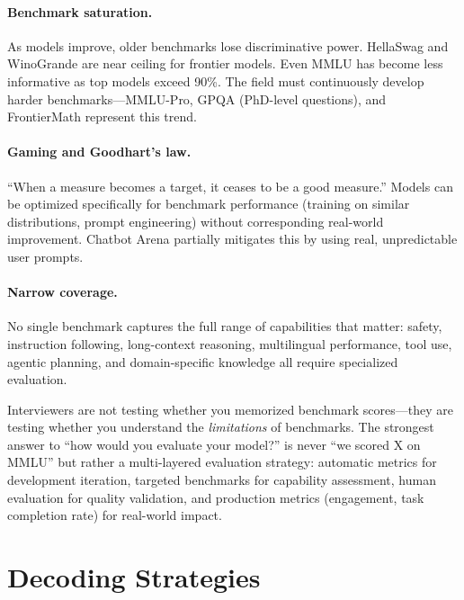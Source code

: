 \paragraph{Benchmark saturation.}
As models improve, older benchmarks lose discriminative power.  HellaSwag and
WinoGrande are near ceiling for frontier models.  Even MMLU has become less
informative as top models exceed 90\%.  The field must continuously develop
harder benchmarks---MMLU-Pro, GPQA (PhD-level questions), and FrontierMath
represent this trend.

\paragraph{Gaming and Goodhart's law.}
``When a measure becomes a target, it ceases to be a good measure.''  Models can
be optimized specifically for benchmark performance (training on similar
distributions, prompt engineering) without corresponding real-world improvement.
Chatbot Arena partially mitigates this by using real, unpredictable user prompts.

\paragraph{Narrow coverage.}
No single benchmark captures the full range of capabilities that matter:
safety, instruction following, long-context reasoning, multilingual performance,
tool use, agentic planning, and domain-specific knowledge all require specialized
evaluation.

\begin{keyinsight}
Interviewers are not testing whether you memorized benchmark scores---they are
testing whether you understand the \emph{limitations} of benchmarks.  The
strongest answer to ``how would you evaluate your model?'' is never ``we scored
X on MMLU'' but rather a multi-layered evaluation strategy: automatic metrics
for development iteration, targeted benchmarks for capability assessment, human
evaluation for quality validation, and production metrics (engagement, task
completion rate) for real-world impact.
\end{keyinsight}

\section{Decoding Strategies}
\label{sec:decoding}

